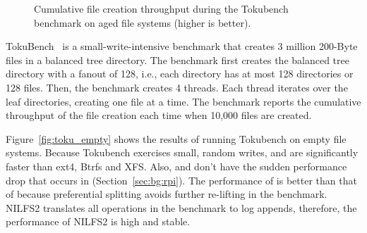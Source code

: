 \begin{figure}[t]
    \centering
    \caption[TokuBench benchmark on aged file systems]{\label{fig:toku_aged}
        Cumulative file creation throughput during the Tokubench benchmark on aged file systems (higher is better).}
\end{figure}

TokuBench~\citep{tokufs} is a small-write-intensive benchmark that creates 3
million 200-Byte files in a balanced tree directory.
The benchmark first creates the balanced tree directory with a fanout of 128,
i.e., each directory has at most 128 directories or 128 files.
Then, the benchmark creates 4 threads.
Each thread iterates over the leaf directories, creating one file at a time.
The benchmark reports the cumulative throughput of the file creation each time
when 10,000 files are created.

Figure~\ref{fig:toku_empty} shows the results of running Tokubench on empty file
systems.
Because Tokubench exercises small, random writes,
\betrfsFour and \betrfsFive are significantly faster than ext4, Btrfs and XFS.
Also, \betrfsFour and \betrfsFive don't have the sudden performance drop that
occurs in \betrfsThree (Section~\ref{sec:bg:rpi}).
The performance of \betrfsFive is better than that of \betrfsFour
because preferential splitting avoids further re-lifting in the benchmark.
NILFS2 translates all operations in the benchmark to log appends, therefore,
the performance of NILFS2 is high and stable.

